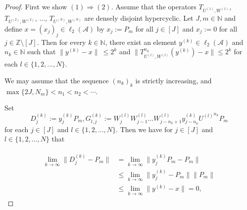 \documentclass[10pt,a4paper]{amsart}
\begin{document}
\begin{proof}
First we show $(1)\Rightarrow(2)$. Assume that the operators $T_{U^{(1)},W^{(1)}}$, $T_{U^{(2)},W^{(2)}}$, ..., $T_{U^{(N)},W^{(N)}}$ are densely disjoint hypercyclic.
Let $J,m\in\mathbb{N}$ and define $x=(x_{j})_{j}\in \ell_{2}{(\mathcal{A})}$ by $x_{j}:=P_{m}$ for all $j\in[J]$ and $x_{j}:=0$ for all $j\in \mathbb{Z}\setminus[J]$. Then for every $k\in \mathbb{N}$, there exist an element $y^{(k)}\in \ell_{2}{(\mathcal{A})}$ and $n_{k}\in\mathbb{N}$ such that $\|y^{(k)}-x\|\ \leq 2^{k}$ and $\|T^{n_{k}}_{U^{(l)},W^{(l)}}(y^{(k)})-x\|\leq 2^k$ for each $l\in \{1,2,...,N\}$.

We may assume that the sequence $(n_{k})_{k}$ is strictly increasing, and $\max\{2J,N_{m}\}<n_{1}<n_{2}<\cdots$.

Set
\[D^{(k)}_{j}:=y^{(k)}_{j}P_{m}, G^{(k)}_{l,j}:=W^{(l)}_{j}W^{(l)}_{j-1}...W^{(l)}_{j-n_{k}+1}y^{(k)}_{j-n_{k}}{U^{(l)}}^{n_{k}}P_{m}\]
for each $j\in[J]$ and $l\in \{1,2,...,N\}$. Then we have for $j\in[J]$ and $l\in\{1,2,...,N\}$ that

\begin{eqnarray}\begin{split}\nonumber
\lim_{k\rightarrow\infty}\|D^{(k)}_{j}-P_{m}\|
&=\lim_{k\rightarrow\infty}\|y^{(k)}_{j}P_{m}-P_{m}\|\\
&\leq \lim_{k\rightarrow\infty}\|y^{(k)}_{j}-P_{m}\|\|P_{m}\|\\
&\leq\lim_{k\rightarrow\infty}\|y^{(k)}-x\|=0,
\end{split}\end{eqnarray}


\end{proof}
\end{document}
